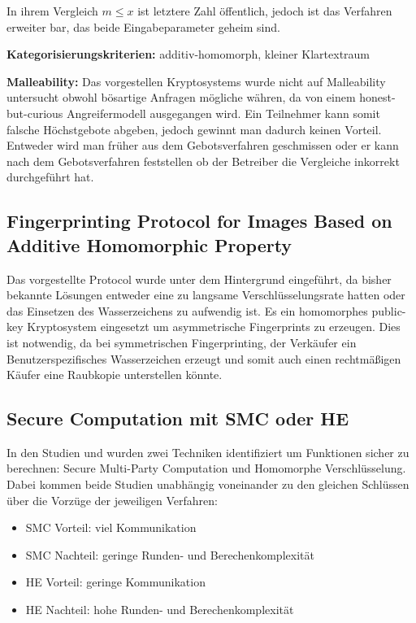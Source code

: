 In ihrem Vergleich $m\leq x$ ist letztere Zahl öffentlich, jedoch ist das Verfahren erweiter bar, das beide Eingabeparameter geheim sind. 

\textbf{Kategorisierungskriterien:} additiv-homomorph, kleiner Klartextraum

\textbf{Malleability:} Das vorgestellen Kryptosystems wurde nicht auf Malleability untersucht obwohl bösartige Anfragen mögliche währen, da von einem honest-but-curious Angreifermodell ausgegangen wird. Ein Teilnehmer kann somit falsche Höchstgebote abgeben, jedoch gewinnt man dadurch keinen Vorteil. Entweder wird man früher aus dem Gebotsverfahren geschmissen oder er kann nach dem Gebotsverfahren feststellen ob der Betreiber die Vergleiche inkorrekt durchgeführt hat.  

\subsection{Fingerprinting Protocol for Images Based on Additive Homomorphic Property}
\cite{kuribayashi2005fingerprinting}
Das vorgestellte Protocol wurde unter dem Hintergrund eingeführt, da bisher bekannte Lösungen entweder eine zu langsame Verschlüsselungsrate hatten oder das Einsetzen des Wasserzeichens zu aufwendig ist. Es ein homomorphes public-key Kryptosystem eingesetzt um asymmetrische Fingerprints zu erzeugen. Dies ist notwendig, da bei symmetrischen Fingerprinting, der Verkäufer ein Benutzerspezifisches Wasserzeichen erzeugt und somit auch einen rechtmäßigen Käufer eine Raubkopie unterstellen könnte. 


\subsection{Secure Computation mit SMC oder HE}
In den Studien \cite[p.420]{damgaard2007efficient} und \cite[p.2]{sadeghi2009efficient} wurden zwei Techniken identifiziert um Funktionen sicher zu berechnen: Secure Multi-Party Computation und Homomorphe Verschlüsselung. Dabei kommen beide Studien unabhängig voneinander zu den gleichen Schlüssen über die Vorzüge der jeweiligen Verfahren:
\begin{itemize}
	\item SMC Vorteil: viel Kommunikation
	\item SMC Nachteil: geringe Runden- und Berechenkomplexität
	\item HE Vorteil: geringe Kommunikation
	\item HE Nachteil: hohe Runden- und Berechenkomplexität
	
\end{itemize}

